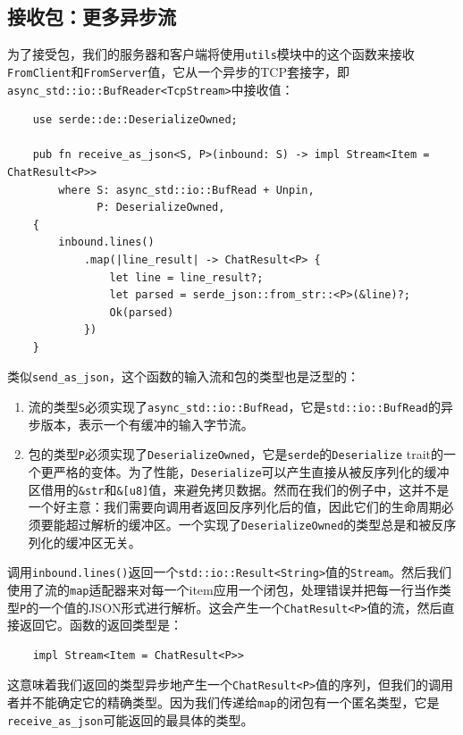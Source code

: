 \subsection{接收包：更多异步流}
为了接受包，我们的服务器和客户端将使用\texttt{utils}模块中的这个函数来接收\texttt{FromClient}和\texttt{FromServer}值，它从一个异步的TCP套接字，即\texttt{async\_std::io::BufReader<TcpStream>}中接收值：
\begin{verbatim}
    use serde::de::DeserializeOwned;

    pub fn receive_as_json<S, P>(inbound: S) -> impl Stream<Item = ChatResult<P>>
        where S: async_std::io::BufRead + Unpin,
              P: DeserializeOwned,
    {
        inbound.lines()
            .map(|line_result| -> ChatResult<P> {
                let line = line_result?;
                let parsed = serde_json::from_str::<P>(&line)?;
                Ok(parsed)
            })
    }
\end{verbatim}

类似\texttt{send\_as\_json}，这个函数的输入流和包的类型也是泛型的：
\begin{enumerate}
    \item 流的类型\texttt{S}必须实现了\texttt{async\_std::io::BufRead}，它是\texttt{std::io::BufRead}的异步版本，表示一个有缓冲的输入字节流。
    \item 包的类型\texttt{P}必须实现了\texttt{DeserializeOwned}，它是\texttt{serde}的\texttt{Deserialize} trait的一个更严格的变体。为了性能，\texttt{Deserialize}可以产生直接从被反序列化的缓冲区借用的\texttt{\&str}和\texttt{\&[u8]}值，来避免拷贝数据。然而在我们的例子中，这并不是一个好主意：我们需要向调用者返回反序列化后的值，因此它们的生命周期必须要能超过解析的缓冲区。一个实现了\texttt{DeserializeOwned}的类型总是和被反序列化的缓冲区无关。
\end{enumerate}

调用\texttt{inbound.lines()}返回一个\texttt{std::io::Result<String>}值的\texttt{Stream}。然后我们使用了流的\texttt{map}适配器来对每一个item应用一个闭包，处理错误并把每一行当作类型\texttt{P}的一个值的JSON形式进行解析。这会产生一个\texttt{ChatResult<P>}值的流，然后直接返回它。函数的返回类型是：
\begin{verbatim}
    impl Stream<Item = ChatResult<P>>
\end{verbatim}

这意味着我们返回的类型异步地产生一个\texttt{ChatResult<P>}值的序列，但我们的调用者并不能确定它的精确类型。因为我们传递给\texttt{map}的闭包有一个匿名类型，它是\texttt{receive\_as\_json}可能返回的最具体的类型。

